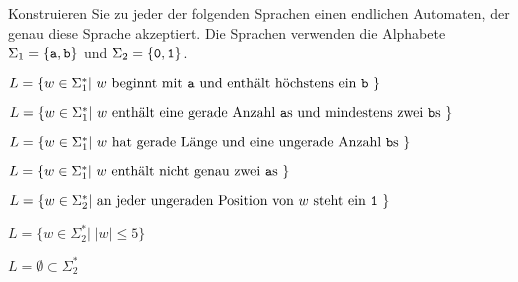 Konstruieren Sie zu jeder der folgenden Sprachen einen
endlichen Automaten, der genau diese Sprache akzeptiert.
Die Sprachen verwenden die Alphabete
$\Sigma_1=\{{\tt a},{\tt b}\}$ und
$\Sigma_2=\{{\tt 0},{\tt 1}\}$.
\begin{teilaufgaben}
\item
$L=\{w\in \Sigma_1^*|\text{
$w$ beginnt mit \texttt{a} und enthält höchstens ein \texttt{b}
}\}$
\item
$L=\{w\in \Sigma_1^*|\text{
$w$ enthält eine gerade Anzahl {\tt a}s und mindestens
zwei {\tt b}s
}\}$
\item
$L=\{w\in \Sigma_1^*|\text{
$w$ hat gerade Länge und eine ungerade Anzahl {\tt b}s
}\}$
\item
$L=\{w\in \Sigma_1^*|\text{
$w$ enthält nicht genau zwei {\tt a}s
}\}$
\item
$L=\{w\in \Sigma_2^*|\text{
an jeder ungeraden Position von $w$ steht ein {\tt 1}
}\}$
\item
$L=\{w\in \Sigma_2^*|\;|w|\le 5\}$
\item
$L=\emptyset\subset \Sigma_2^*$
\end{teilaufgaben}


